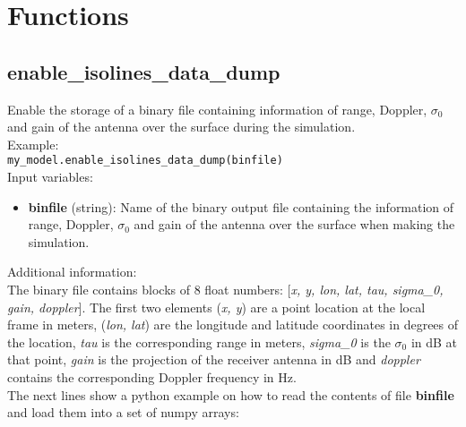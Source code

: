 \section{Functions}

\subsection{enable\_isolines\_data\_dump}

Enable the storage of a binary file containing information of range, Doppler, $\sigma_0$ and gain of the antenna over the surface during the simulation.\\

Example:\\

\texttt{my\_model.enable\_isolines\_data\_dump(binfile)}\\

Input variables:
\begin{itemize}
\item {\bf binfile} (string): Name of the binary output file containing the information of range, Doppler, $\sigma_0$ and gain of the antenna over the surface when making the simulation.
\end{itemize}

Additional information:\\

The binary file contains blocks of 8 float numbers: [{\it x, y, lon, lat, tau, sigma\_0, gain, doppler}]. The first two elements ({\it x, y}) are a point location at the local frame in meters, ({\it lon, lat}) are the longitude and latitude coordinates in degrees of the location,  {\it tau} is the corresponding range in meters, {\it sigma\_0} is the $\sigma_0$ in dB at that point, {\it gain} is the projection of the receiver antenna in dB and {\it doppler} contains the corresponding Doppler frequency in Hz.\\

The next lines show a python example on how to read the contents of file {\bf binfile} and load them into a set of numpy arrays:

